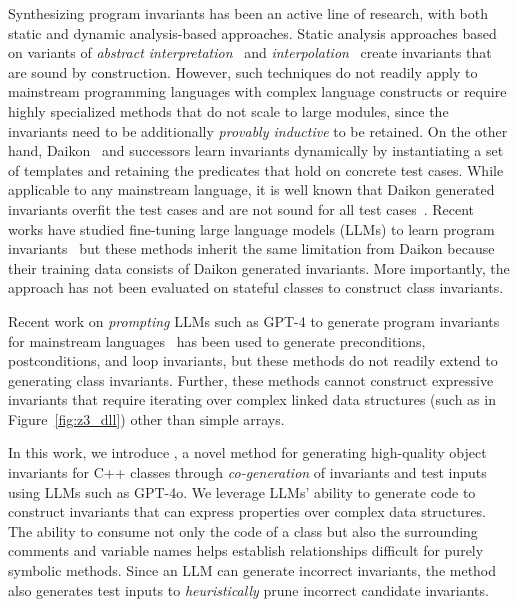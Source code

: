 Synthesizing program invariants has been an active line of research, with both static and dynamic analysis-based approaches. 
Static analysis approaches based on variants of \textit{abstract interpretation}~\cite{cousot1977abstract} and \textit{interpolation}~\cite{henzinger2004abstractions} create invariants that are sound by construction. 
However, such techniques do not readily apply to mainstream programming languages with complex language constructs or require highly specialized methods that do not scale to large modules, since the invariants need to be additionally \textit{provably inductive} to be retained. 
On the other hand, Daikon~\cite{ernst2007daikon} and successors learn invariants dynamically by instantiating a set of templates and retaining the predicates that hold on concrete test cases. 
While applicable to any mainstream language, it is well known that Daikon generated invariants overfit the test cases and are not sound for all test cases~\cite{polikarpova2009comparative}.
Recent works have studied fine-tuning large language models (LLMs) to learn program invariants~\cite{pei2023learning} but these methods inherit the same limitation from Daikon because their training data consists of Daikon generated invariants. More importantly, the approach has not been evaluated on stateful classes to construct class invariants. 

Recent work on \textit{prompting} LLMs such as GPT-4 to generate program invariants for mainstream languages~\cite{nl2postcond,greiner2024automated,ma2024specgen}  
has been used to generate preconditions, postconditions, and loop invariants, but these methods do not readily extend to generating class invariants.
Further, these methods cannot construct expressive invariants that require iterating over complex linked data structures (such as in Figure~\ref{fig:z3_dll}) other than simple arrays. 

In this work, we introduce \tech, a novel method for generating high-quality object invariants for C++ classes through \emph{co-generation} of invariants and test inputs using LLMs such as GPT-4o.
We leverage LLMs' ability to generate code to construct invariants that can express properties over complex data structures.
The ability to consume not only the code of a class but also the surrounding comments and variable names helps establish relationships difficult for purely symbolic methods.
Since an LLM can generate incorrect invariants, the method also generates test inputs to \emph{heuristically} prune incorrect candidate invariants. 


